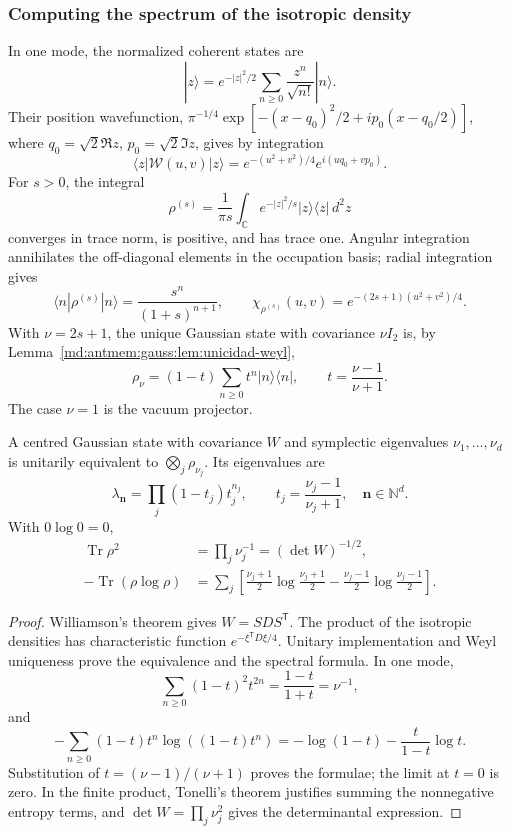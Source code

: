 \subsubsection{Computing the spectrum of the isotropic density}
In one mode, the normalized coherent states are
\[
 |z\rangle=e^{-|z|^2/2}\sum_{n\geq0}\frac{z^n}{\sqrt{n!}}|n\rangle.
\]
Their position wavefunction,
\(\pi^{-1/4}\exp[-(x-q_0)^2/2+ip_0(x-q_0/2)]\), where
\(q_0=\sqrt2\Re z\), \(p_0=\sqrt2\Im z\), gives by integration
\[
 \langle z|\mathcal W(u,v)|z\rangle
 =e^{-(u^2+v^2)/4}e^{i(uq_0+vp_0)}.
\]
For \(s>0\), the integral
\[
 \rho^{(s)}=\frac1{\pi s}\int_{\mathbb C} e^{-|z|^2/s}
 |z\rangle\langle z|\,d^2z
\]
converges in trace norm, is positive, and has trace one. Angular
integration annihilates the off-diagonal elements in the occupation basis;
radial integration gives
\[
 \langle n|\rho^{(s)}|n\rangle=\frac{s^n}{(1+s)^{n+1}},\qquad
 \chi_{\rho^{(s)}}(u,v)=e^{-(2s+1)(u^2+v^2)/4}.
\]
With \(\nu=2s+1\), the unique Gaussian state with covariance
\(\nu I_2\) is, by Lemma~\ref{md:antmem:gauss:lem:unicidad-weyl},
\begin{equation}
 \rho_\nu=(1-t)\sum_{n\geq0}t^n|n\rangle\langle n|,
 \qquad t=\frac{\nu-1}{\nu+1}.
 \label{md:antmem:gauss:eq:estado-geometrico}
\end{equation}
The case \(\nu=1\) is the vacuum projector.

\begin{theorem}
\label{md:antmem:gauss:thm:espectro-gaussiano}
A centred Gaussian state with covariance \(W\) and symplectic
eigenvalues \(\nu_1,\ldots,\nu_d\) is unitarily equivalent
to \(\bigotimes_j\rho_{\nu_j}\). Its eigenvalues are
\[
 \lambda_{\mathbf n}=\prod_j(1-t_j)t_j^{n_j},\qquad
 t_j=\frac{\nu_j-1}{\nu_j+1},\quad \mathbf n\in\mathbb N^d.
\]
With \(0\log0=0\),
\begin{align}
 \operatorname{Tr}\rho^2&=\prod_j\nu_j^{-1}=(\det W)^{-1/2},
 \label{md:antmem:gauss:eq:pureza-general}\\
 -\operatorname{Tr}(\rho\log\rho)&=\sum_j
 \left[\frac{\nu_j+1}{2}\log\frac{\nu_j+1}{2}
 -\frac{\nu_j-1}{2}\log\frac{\nu_j-1}{2}\right].
 \label{md:antmem:gauss:eq:entropia-general}
\end{align}
\end{theorem}
\begin{proof}
Williamson's theorem gives \(W=SDS^{\mathsf T}\). The product of the isotropic
densities has characteristic function \(e^{-\xi^{\mathsf T}D\xi/4}\).
Unitary implementation and Weyl uniqueness prove the
equivalence and the spectral formula. In one mode,
\[
 \sum_{n\geq0}(1-t)^2t^{2n}=\frac{1-t}{1+t}=\nu^{-1},
\]
and
\[
 -\sum_{n\geq0}(1-t)t^n\log((1-t)t^n)
 =-\log(1-t)-\frac{t}{1-t}\log t.
\]
Substitution of \(t=(\nu-1)/(\nu+1)\) proves the formulae; the
limit at \(t=0\) is zero. In the finite product, Tonelli's theorem justifies
summing the nonnegative entropy terms, and
\(\det W=\prod_j\nu_j^2\) gives the determinantal expression.
\end{proof}


